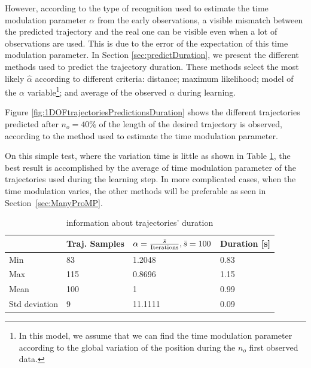 \documentclass[utf8]{frontiersSCNS} %
\newcommand{\todo}[1]{\textcolor{red}{\textbf{/*#1*/}}}
\begin{document}
However, according to the type of recognition  used to estimate the time modulation parameter $\alpha$ from the early observations, a visible mismatch between the predicted trajectory and the real one can be visible even when a lot of observations are used. This is due to the error of the expectation of this time modulation parameter. In Section \ref{sec:predictDuration}, we present the different methods used to predict the trajectory duration. These methods select the most likely $\hat{\alpha}$ according to different criteria: distance; maximum likelihood; model of the $\alpha$ variable\footnote{In this model, we assume that we can find the time modulation parameter according to the global variation of the position during the $n_o$ first observed data.}; and average of the observed $\alpha$ during learning.
%
%

Figure \ref{fig:1DOFtrajectoriesPredictionsDuration} shows the different trajectories predicted after $n_{o}=40\%$ of the length of the desired trajectory is observed, according to the method used to estimate the time modulation parameter. 

On this simple test, where the variation time is little as shown in Table \ref{tab:alphaProMP}, the best result is accomplished by the average of time modulation parameter of the trajectories used during the learning step. In more complicated cases, when the time modulation varies, the other methods will be preferable as seen in Section~\ref{sec:ManyProMP}.
\begin{table}
\center
\begin{tabular}{|p{2.5cm}|p{2.5cm}|p{4.5cm}|p{2.5cm}|}
  \hline
    & Traj. Samples & $\alpha = {\bar{s} \over \mathrm{Iterations}}, \bar{s}=100$ & Duration [s] \\
     \hline
     Min & 83 & 1.2048 & 0.83 \\
     \hline
     Max & 115 & 0.8696 & 1.15\\
     \hline
     Mean & 100& 1& 0.99 \\
     \hline
     Std deviation & 9 & 11.1111 & 0.09 \\
     \hline
\end{tabular}
\caption{information about trajectories' duration}
\label{tab:alphaProMP}
\end{table} 
\end{document}
